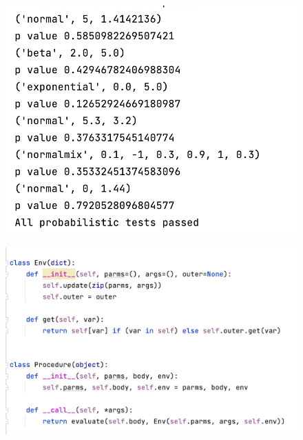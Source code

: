 \documentclass{article}
\begin{document}
\begin{enumerate}
\begin{figure}[!ht]
	\centering
	\includegraphics[scale=0.5]{../figs/probabilistic_tests}
\end{figure}

\newpage
\begin{figure}[!ht]
	\centering
	\includegraphics[scale=0.5]{../figs/evaluate_1}
\end{figure}


\end{enumerate}
\end{document}
